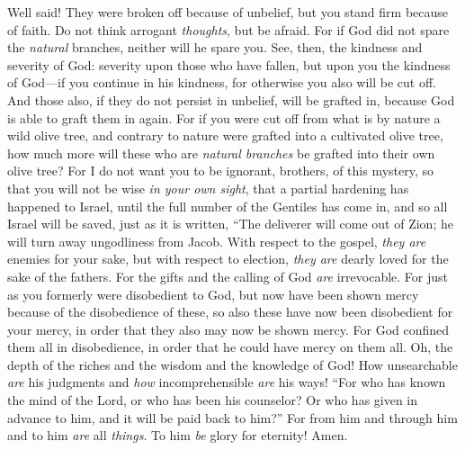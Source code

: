 \begin{biblechapter}
\verse Well said! They were broken off because of unbelief, but you stand firm because of faith. Do not think arrogant \textit{thoughts}, but be afraid.
\verse For if God did not spare the \textit{natural} branches, neither will he spare you.
\verse See, then, the kindness and severity of God: severity upon those who have fallen, but upon you the kindness of God—if you continue in his kindness, for otherwise you also will be cut off.
\verse And those also, if they do not persist in unbelief, will be grafted in, because God is able to graft them in again.
\verse For if you were cut off from what is by nature a wild olive tree, and contrary to nature were grafted into a cultivated olive tree, how much more will these who are \textit{natural branches} be grafted into their own olive tree?
 For I do not want you to be ignorant, brothers, of this mystery, so that you will not be wise \textit{in your own sight}, that a partial hardening has happened to Israel, until the full number of the Gentiles has come in,
\verse and so all Israel will be saved, just as it is written,
\verse “The deliverer will come out of Zion; 
he will turn away ungodliness from Jacob.
\verse With respect to the gospel, \textit{they are} enemies for your sake, but with respect to election, \textit{they are} dearly loved for the sake of the fathers.
\verse For the gifts and the calling of God \textit{are} irrevocable.
\verse For just as you formerly were disobedient to God, but now have been shown mercy because of the disobedience of these,
\verse so also these have now been disobedient for your mercy, in order that they also may now be shown mercy.
\verse For God confined them all in disobedience, in order that he could have mercy on them all.
\verse Oh, the depth of the riches 
and the wisdom and the knowledge of God! 
How unsearchable \textit{are} his judgments 
and \textit{how} incomprehensible \textit{are} his ways!
\verse “For who has known the mind of the Lord, 
or who has been his counselor?
\verse Or who has given in advance to him, 
and it will be paid back to him?”
\verse For from him and through him and to him \textit{are} all \textit{things}. 
To him \textit{be} glory for eternity! Amen.
\end{biblechapter}

